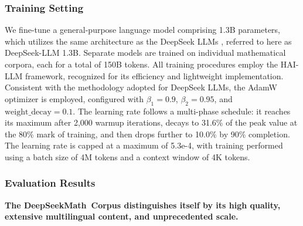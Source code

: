 \subsubsection{Training Setting}
\label{sec:quality-policy}
We fine-tune a general-purpose language model comprising 1.3B parameters, which utilizes the same architecture as the DeepSeek LLMs \citep{deepseek-llm}, referred to here as DeepSeek-LLM 1.3B. Separate models are trained on individual mathematical corpora, each for a total of 150B tokens. All training procedures employ the HAI-LLM \citep{haillm} framework, recognized for its efficiency and lightweight implementation. Consistent with the methodology adopted for DeepSeek LLMs, the AdamW optimizer \citep{adamW} is employed, configured with $\beta_1=0.9$, $\beta_2=0.95$, and $\mathrm{weight\_decay}=0.1$. The learning rate follows a multi-phase schedule: it reaches its maximum after 2,000 warmup iterations, decays to 31.6\% of the peak value at the 80\% mark of training, and then drops further to 10.0\% by 90\% completion. The learning rate is capped at a maximum of 5.3e-4, with training performed using a batch size of 4M tokens and a context window of 4K tokens.

\subsubsection{Evaluation Results}

\textbf{The DeepSeekMath~Corpus distinguishes itself by its high quality, extensive multilingual content, and unprecedented scale.}

